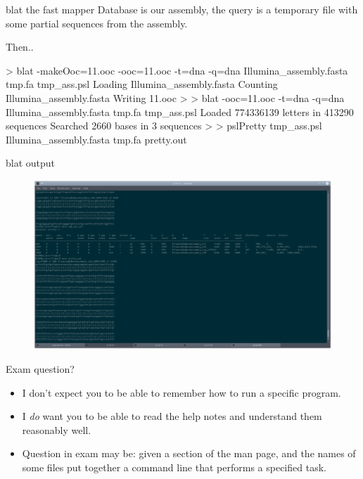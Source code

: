 \documentclass[pdf]{beamer}
\begin{document}
\begin{frame}[fragile]{blat the fast mapper}
  Database is our assembly, the query is a temporary file with some partial
  sequences from the assembly.

  Then.. 
  \begin{consolecode}
> blat -makeOoc=11.ooc -ooc=11.ooc -t=dna -q=dna Illumina_assembly.fasta tmp.fa tmp_ass.psl
Loading Illumina_assembly.fasta
Counting Illumina_assembly.fasta
Writing 11.ooc
>
> blat -ooc=11.ooc -t=dna -q=dna Illumina_assembly.fasta tmp.fa tmp_ass.psl
Loaded 774336139 letters in 413290 sequences
Searched 2660 bases in 3 sequences
>
> pslPretty tmp_ass.psl Illumina_assembly.fasta tmp.fa pretty.out
  \end{consolecode}
\end{frame}

\begin{frame}[fragile]{blat output}
  \begin{figure}[ht]
    \includegraphics[width=\textwidth]{images/blat_output}
  \end{figure}
  
\end{frame}

\begin{frame}{Exam question?}
  \begin{itemize}
  \item I don't expect you to be able to remember how to run a specific
    program.
  \item I \emph{do} want you to be able to read the help notes and understand
    them reasonably well.
  \item Question in exam may be: given a section of the man page, and the
    names of some files put together a command line that performs a specified
    task.
  \end{itemize}
\end{frame}
\end{document}
